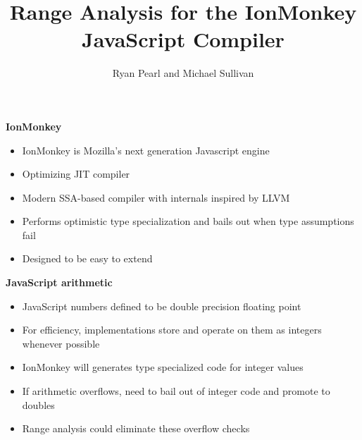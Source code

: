 \documentclass{slides}
\begin{document}
\title{\bf Range Analysis for the IonMonkey JavaScript Compiler}
\author{Ryan Pearl and Michael Sullivan}

\maketitle

\begin{slide}
\begin{center}
{\Huge \bf{IonMonkey}}
\end{center}

\begin{itemize}
\item IonMonkey is Mozilla's next generation Javascript engine
\item Optimizing JIT compiler
\item Modern SSA-based compiler with internals inspired by LLVM
\item Performs optimistic type specialization and bails out when type
  assumptions fail
\item Designed to be easy to extend
\end{itemize}
\end{slide}

\begin{slide}
\begin{center}
{\Huge \bf{JavaScript arithmetic}}
\end{center}
\begin{itemize}
\item JavaScript numbers defined to be double precision floating point
\item For efficiency, implementations store and operate on them as
  integers whenever possible
\item IonMonkey will generates type specialized code for integer values
\item If arithmetic overflows, need to bail out of integer code and
  promote to doubles
\item Range analysis could eliminate these overflow checks
\end{itemize}
\end{slide}
\end{document}

